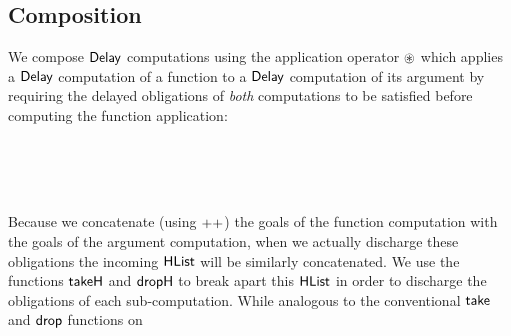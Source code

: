 \documentclass[sigplan]{acmart}%
\begin{document}
\subsection{Composition}
We compose $\AgdaDatatype{Delay}$ computations using the application operator 
$\AgdaFunction{\ensuremath{\circledast}}$ which applies a $\AgdaDatatype{Delay}$
computation of a function to a $\AgdaDatatype{Delay}$ computation of its argument
by requiring the delayed obligations of \emph{both} computations to be satisfied before computing 
the function application:
\begin{code}
\>[2]\AgdaOperator{\AgdaFunction{\AgdaUnderscore{}\ensuremath{\circledast}\AgdaUnderscore{}}}\AgdaSpace{}%
\AgdaSymbol{:}%
\>[11]\AgdaSpace{}%
\AgdaSymbol{(}\AgdaSpace{}%
\AgdaSpace{}%
\AgdaSymbol{)}\AgdaSpace{}%
\AgdaSpace{}%
\AgdaSpace{}%
\AgdaSpace{}%
\AgdaSpace{}%
\AgdaSpace{}%
\<%
\\
%
\>[2]\AgdaSpace{}%
\AgdaSpace{}%
\AgdaSpace{}%
\AgdaOperator{\AgdaFunction{\ensuremath{\circledast}}}\AgdaSpace{}%
\AgdaSpace{}%
\AgdaSpace{}%
\<%
\\
\>[2][@{}l@{\AgdaIndent{0}}]%
\>[4]\AgdaSymbol{=}\AgdaSpace{}%
%
\>[138I]\AgdaSymbol{(}\AgdaSpace{}%
\AgdaOperator{\AgdaFunction{++}}\AgdaSpace{}%
%
\AgdaSymbol{)}\<%
\\
\>[.][@{}l@{}]\<[138I]%
\>[10]\AgdaSpace{}%
\AgdaSpace{}%
\AgdaSpace{}%
\AgdaSpace{}%
\AgdaSymbol{(}\AgdaSpace{}%
\AgdaSymbol{)}\AgdaSpace{}%
\AgdaSymbol{(}\AgdaSpace{}%
\AgdaSymbol{(}\AgdaSpace{}%
\AgdaSymbol{))}\<%
\end{code}
Because we concatenate (using $++$) the goals of the function computation 
with the goals of the argument computation, when we actually discharge these obligations 
the incoming $\AgdaDatatype{HList}$ will be similarly concatenated. We use the functions 
$\AgdaFunction{takeH}$ and $\AgdaFunction{dropH}$ to break apart this $\AgdaDatatype{HList}$ in order to 
discharge the obligations of each sub-computation. While analogous to the 
conventional $\AgdaFunction{take}$ and $\AgdaFunction{drop}$ functions on
\end{document}
